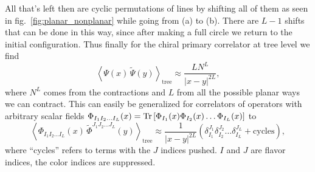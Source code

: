 All that's left then are cyclic permutations of lines by shifting all of them as seen in \mbox{fig. \ref{fig:planar_nonplanar}} while going from (a) to (b). 
There are $L-1$ shifts that can be done in this way, since after making a full circle we return to the initial configuration. 
Thus finally for the chiral primary correlator at tree level we find
\begin{equation}
	\left< \Psi(x) \, \tilde{\Psi}(y) \right>_{\mathrm{tree}} \approx \frac{L N^L}{|x-y|^{2L}},
\end{equation}
where $N^L$ comes from the contractions and $L$ from all the possible planar ways we can contract. 
This can easily be generalized for correlators of operators with arbitrary scalar fields $\Phi_{I_1 I_2 \dots I_L}(x) = \mathrm{Tr} \left[ \Phi_{I_1}(x) \Phi_{I_2}(x) \dots \Phi_{I_L}(x) \right]$ to
\begin{equation}
	\left< \Phi_{I_1 I_2 \dots I_L}(x) \, \tilde{\Phi}^{J_1 J_2 \dots J_L}(y)  \right>_{\mathrm{tree}} \approx \frac{1}{|x-y|^{2L}} \left( \delta_{I_1}^{J_1} \delta_{I_2}^{J_2} \dots \delta_{I_L}^{J_L} + \mathrm{cycles} \right),
	\label{eq:tree_correlator}
\end{equation}
where ``cycles'' refers to terms with the $J$ indices pushed. 
$I$ and $J$ are flavor indices, the color indices are suppressed.
 
